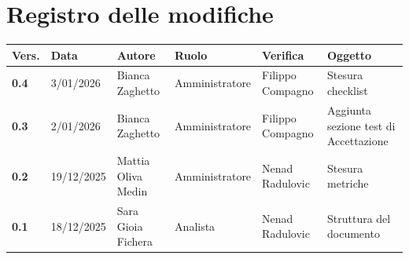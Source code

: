 \documentclass[a4paper,12pt]{article}
\begin{document}
    

    \section*{Registro delle modifiche} {
        \begin{table}[h!]
                \begin{tabularx}{\textwidth}{|l|l|l|l|L|L|}
                \hline
                \textbf{Vers.} & \textbf{Data} & \textbf{Autore} & \textbf{Ruolo} & \textbf{Verifica} & \textbf{Oggetto} \\
                \hline
                \textbf{0.4} & 3/01/2026 & Bianca Zaghetto & Amministratore & Filippo Compagno & Stesura checklist \\
                \hline
                \textbf{0.3} & 2/01/2026 & Bianca Zaghetto & Amministratore & Filippo Compagno & Aggiunta sezione test di Accettazione \\
                \hline
                \textbf{0.2} & 19/12/2025 & Mattia Oliva Medin & Amministratore & Nenad Radulovic & Stesura metriche\\
                \hline
                \textbf{0.1} & 18/12/2025 & Sara Gioia Fichera & Analista & Nenad Radulovic & Struttura del documento \\
                \hline
            \end{tabularx}
        \end{table}
    }
    \newpage
    
   \tableofcontents
    \newpage

    \listoffigures
    \newpage

    \listoftables
    \newpage
\end{document}
